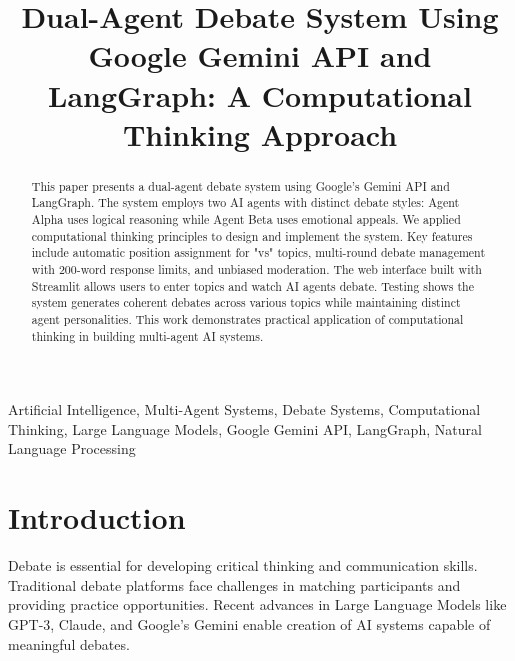 \documentclass[conference]{IEEEtran}
\begin{document}
\title{Dual-Agent Debate System Using Google Gemini API and LangGraph: A Computational Thinking Approach}

\author{
\and
{}
}

\maketitle

\begin{abstract}
This paper presents a dual-agent debate system using Google's Gemini API and LangGraph. The system employs two AI agents with distinct debate styles: Agent Alpha uses logical reasoning while Agent Beta uses emotional appeals. We applied computational thinking principles to design and implement the system. Key features include automatic position assignment for "vs" topics, multi-round debate management with 200-word response limits, and unbiased moderation. The web interface built with Streamlit allows users to enter topics and watch AI agents debate. Testing shows the system generates coherent debates across various topics while maintaining distinct agent personalities. This work demonstrates practical application of computational thinking in building multi-agent AI systems.
\end{abstract}

\begin{IEEEkeywords}
Artificial Intelligence, Multi-Agent Systems, Debate Systems, Computational Thinking, Large Language Models, Google Gemini API, LangGraph, Natural Language Processing
\end{IEEEkeywords}

\section{Introduction}

Debate is essential for developing critical thinking and communication skills. Traditional debate platforms face challenges in matching participants and providing practice opportunities. Recent advances in Large Language Models like GPT-3, Claude, and Google's Gemini enable creation of AI systems capable of meaningful debates.
\end{document}
